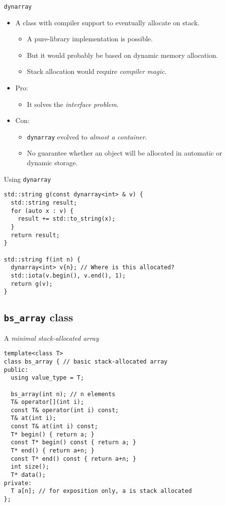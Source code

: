 \begin{frame}{\texttt{dynarray}}
  \begin{itemize}
    \item A class with compiler support to eventually allocate on stack.
      \begin{itemize}
        \item A pure-library implementation is possible.
        \item But it would probably be based on dynamic memory allocation.
        \item Stack allocation would require \emph{compiler magic}.
      \end{itemize}
    \item Pro:
      \begin{itemize}
        \item It solves the \emph{interface problem}.
      \end{itemize}
    \item Con:
      \begin{itemize}
        \item \texttt{dynarray} evolved to \emph{almost a container}.
        \item No guarantee whether an object will be allocated in automatic or dynamic storage.
      \end{itemize}
  \end{itemize}
\end{frame}

\begin{frame}[t,fragile]{Using \texttt{dynarray}}
\begin{lstlisting}[style=cpp11]
std::string g(const dynarray<int> & v) {
  std::string result;
  for (auto x : v) {
    result += std::to_string(x);
  }
  return result;
}

std::string f(int n) {
  dynarray<int> v{n}; // Where is this allocated?
  std::iota(v.begin(), v.end(), 1);
  return g(v);
} 
\end{lstlisting}
\end{frame}

\subsection{\texttt{bs\_array} class}

\begin{frame}[t,fragile]{A \emph{minimal stack-allocated array}}
\begin{lstlisting}[style=cpp11]
template<class T>
class bs_array { // basic stack-allocated array
public:
  using value_type = T;

  bs_array(int n); // n elements
  T& operator[](int i); 
  const T& operator(int i) const; 
  T& at(int i); 
  const T& at(int i) const; 
  T* begin() { return a; } 
  const T* begin() const { return a; }
  T* end() { return a+n; }
  const T* end() const { return a+n; }
  int size();
  T* data();
private:
  T a[n]; // for exposition only, a is stack allocated
};
\end{lstlisting}
\end{frame}

